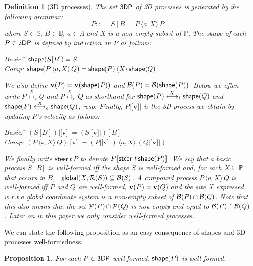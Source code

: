 \documentclass[11pt]{article}
\newcommand{\lsbrace}{\ensuremath{|\![}}
\newcommand{\rsbrace}{\ensuremath{]\!|}}
\newcommand{\shapes}{\mathbb{S}}
\newcommand{\reference}{{\sf global}}
\newcommand{\vect}[1]{\mathbf{#1}}
\newcommand{\gor}{\;\big|\;}
\newcommand{\proc}{\sf{3DP}}
\newcommand{\bpa}{\mathbb{B}}
\newcommand{\move}{\ensuremath{\mathsf{steer}}}
\newcommand{\union}[1]{\ensuremath{\,\langle #1 \rangle\,}}
\newcommand{\unionc}[1]{\,\langle #1 \rangle\,}
\newcommand{\pos}{{\mathbb P}}
\newcommand{\collision}[2]{\stackrel{{#1}}{\longleftrightarrow}_{#2}}
\newcommand{\shape}{{\sf shape}}
\newcommand{\boundary}[1]{\ensuremath{{\cal B}(#1)}}
\newcommand{\points}[1]{\ensuremath{{\cal P}(#1)}}
\newcommand{\velocity}[1]{{\bf v}(#1)}
\newcommand{\referencepoint}[1]{\ensuremath{{\cal R}(#1)}}
\newtheorem{definition}{Definition}
\newtheorem{proposition}{Proposition}
\begin{document}
\begin{definition}[3D processes]
\label{def:processes}
The set $\proc$ of {\em 3D processes} is generated by the following grammar:
$$P:: = S[B] \gor P \unionc{a,X} P$$
where $S\in \shapes$, $B \in \bpa$, $a \in \Lambda$ and $X$ is a non-empty subset of $\pos$. The
shape of each $P\in \proc$ is defined by induction on $P$ as follows:

\begin{tabbing}
Basic: \quad \= $\shape(S[B]) = S$\\
Comp: \> $\shape(P \unionc{a,X} Q) = \shape(P) \union{X} \shape(Q)$
\end{tabbing}
We also define $\velocity{P} = \velocity{\shape(P)}$ and $\boundary{P} =\boundary{\shape(P)}$. Below
we often write $P \collision{X}{i}Q$  and $P \collision{X}{e} Q$ as  shorthand for $\shape(P)
\collision{X}{i} \shape(Q)$ and $\shape(P) \collision{X}{e} \shape(Q)$, resp. Finally, $P \lsbrace
\vect{v} \rsbrace$ is the 3D process we obtain by updating $P$'s velocity as follows:
\begin{tabbing}
Basic: \quad \=  $(S[B])\lsbrace \vect{v} \rsbrace = (S\lsbrace \vect{v} \rsbrace)[B]$\\
Comp: \> $(P \unionc{a,X} Q)\lsbrace \vect{v} \rsbrace = (P\lsbrace \vect{v} \rsbrace)
\unionc{a,X} (Q\lsbrace \vect{v} \rsbrace)$
\end{tabbing}
We finally write $\move\ t \, P$ to denote $P \lsbrace \move\ t \, \shape(P) \rsbrace$. We say that
a basic process $S[B]$ is {\em well-formed} iff the shape $S$ is well-formed and, for each $X
\subseteq \pos$ that occurs in $B$, \ $\reference(X, \referencepoint{S} ) \subseteq \boundary{S}$. A
compound process $P \unionc{a,X} Q$ is well-formed iff $P$ and $Q$ are well-formed, $\velocity{P} =
\velocity{Q}$ and the site $X$ expressed w.r.t a global coordinate system is a non-empty subset of
$\boundary{P} \cap \boundary{Q}$. Note that this also means that the set $\points{P} \cap
\points{Q}$ is non-empty and equal to $\boundary{P} \cap \boundary{Q}$. Later on in this paper we
only consider well-formed processes.
\end{definition}

We can state the following proposition as an easy consequence of shapes and 3D processes
well-formedness.

\begin{proposition}
\label{prop:well-formed}
For each $P \in \proc$ well-formed, $\shape(P)$ is well-formed.
\end{proposition}
\end{document}
